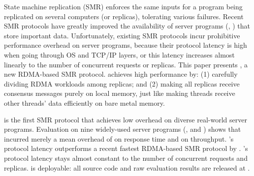 State machine replication (SMR) enforces the same inputs 
for a program being replicated on several computers (or replicas), 
tolerating various failures. Recent SMR protocols have greatly improved
the availability of server programs (\eg, \redis) that store important data. 
Unfortunately, existing SMR protocols incur prohibitive performance overhead on 
server programs, because their protocol latency is high when going through OS 
and TCP/IP layers, or this latency increases almost linearly to the number of 
concurrent requests or replicas. This paper presents \xxx, a new 
RDMA-based SMR protocol. \xxx achieves high performance by: (1) carefully 
dividing RDMA workloads among replicas; and (2) making all replicas receive 
consensus messages purely on local memory, just like making threads receive 
other threads' data efficiently on bare metal memory.


\xxx is the first SMR protocol that achieves low overhead on diverse 
real-world server programs. Evaluation on nine widely-used server programs (\eg, 
\redis and \mysql) shows that \xxx incurred merely a mean overhead of 
\latencyoverhead on response time and \tputoverhead on throughput.
\xxx's protocol latency outperforms a recent fastest RDMA-based SMR protocol 
by \fasterDARE. \xxx's protocol latency stays almost constant to the number 
of concurrent requests and replicas. \xxx is deployable: all source code and 
raw evaluation results are released at \github.



